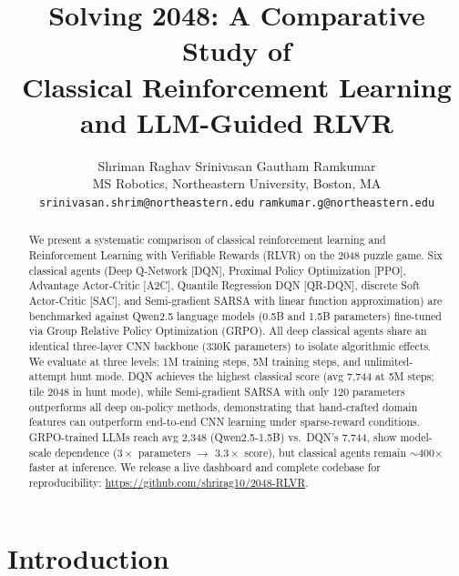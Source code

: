 \documentclass[letterpaper]{article}
\begin{document}
\title{Solving 2048: A Comparative Study of\\Classical Reinforcement Learning and LLM-Guided RLVR}

\author{
Shriman Raghav Srinivasan \quad Gautham Ramkumar \\
MS Robotics, Northeastern University, Boston, MA \\
\texttt{srinivasan.shrim@northeastern.edu} \quad \texttt{ramkumar.g@northeastern.edu}
}

\maketitle

\begin{abstract}
We present a systematic comparison of classical reinforcement learning and Reinforcement Learning with Verifiable Rewards (RLVR) on the 2048 puzzle game. Six classical agents (Deep Q-Network [DQN], Proximal Policy Optimization [PPO], Advantage Actor-Critic [A2C], Quantile Regression DQN [QR-DQN], discrete Soft Actor-Critic [SAC], and Semi-gradient SARSA with linear function approximation) are benchmarked against Qwen2.5 language models (0.5B and 1.5B parameters) fine-tuned via Group Relative Policy Optimization (GRPO). All deep classical agents share an identical three-layer CNN backbone (330K parameters) to isolate algorithmic effects. We evaluate at three levels: 1M training steps, 5M training steps, and unlimited-attempt hunt mode. DQN achieves the highest classical score (avg 7,744 at 5M steps; tile 2048 in hunt mode), while Semi-gradient SARSA with only 120 parameters outperforms all deep on-policy methods, demonstrating that hand-crafted domain features can outperform end-to-end CNN learning under sparse-reward conditions. GRPO-trained LLMs reach avg 2,348 (Qwen2.5-1.5B) vs.\ DQN's 7,744, show model-scale dependence ($3\times$ parameters $\to$ $3.3\times$ score), but classical agents remain $\sim$400$\times$ faster at inference. We release a live dashboard and complete codebase for reproducibility: \url{https://github.com/shrirag10/2048-RLVR}.
\end{abstract}

\section{Introduction}
\label{sec:intro}
\end{document}

